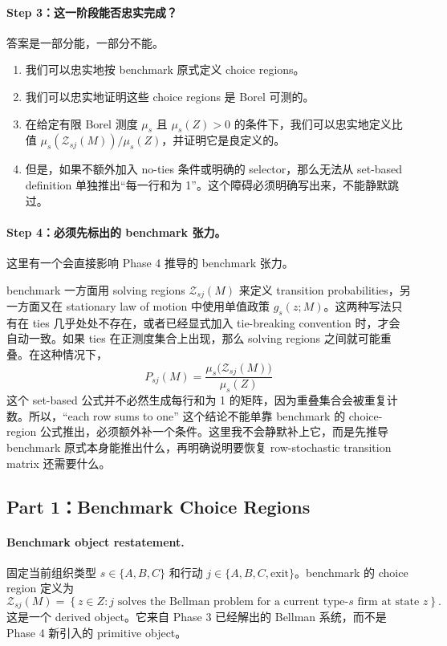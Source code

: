 \paragraph{Step 3：这一阶段能否忠实完成？}
答案是一部分能，一部分不能。
\begin{enumerate}
    \item 我们可以忠实地按 benchmark 原式定义 choice regions。
    \item 我们可以忠实地证明这些 choice regions 是 Borel 可测的。
    \item 在给定有限 Borel 测度 $\mu_s$ 且 $\mu_s(Z)>0$ 的条件下，我们可以忠实地定义比值 $\mu_s(\mathcal Z_{sj}(M))/\mu_s(Z)$，并证明它是良定义的。
    \item 但是，如果不额外加入 no-ties 条件或明确的 selector，那么无法从 set-based definition 单独推出“每一行和为 1”。这个障碍必须明确写出来，不能静默跳过。
\end{enumerate}

\paragraph{Step 4：必须先标出的 benchmark 张力。}
这里有一个会直接影响 Phase 4 推导的 benchmark 张力。

benchmark 一方面用 solving regions $\mathcal Z_{sj}(M)$ 来定义 transition probabilities，另一方面又在 stationary law of motion 中使用单值政策 $g_s(z;M)$。这两种写法只有在 ties 几乎处处不存在，或者已经显式加入 tie-breaking convention 时，才会自动一致。如果 ties 在正测度集合上出现，那么 solving regions 之间就可能重叠。在这种情况下，
\[
P_{sj}(M)=\frac{\mu_s\bigl(\mathcal Z_{sj}(M)\bigr)}{\mu_s(Z)}
\]
这个 set-based 公式并不必然生成每行和为 1 的矩阵，因为重叠集合会被重复计数。所以，“each row sums to one” 这个结论不能单靠 benchmark 的 choice-region 公式推出，必须额外补一个条件。这里我不会静默补上它，而是先推导 benchmark 原式本身能推出什么，再明确说明要恢复 row-stochastic transition matrix 还需要什么。

\subsection{Part 1：Benchmark Choice Regions}

\paragraph{Benchmark object restatement.}
固定当前组织类型 $s\in\{A,B,C\}$ 和行动 $j\in\{A,B,C,\mathrm{exit}\}$。benchmark 的 choice region 定义为
\[
\mathcal Z_{sj}(M)=\left\{z\in Z: j \text{ solves the Bellman problem for a current type-}s\text{ firm at state } z\right\}.
\]
这是一个 derived object。它来自 Phase 3 已经解出的 Bellman 系统，而不是 Phase 4 新引入的 primitive object。

